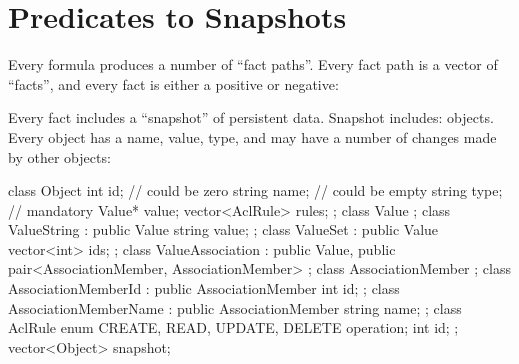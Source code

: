 \documentclass[12pt,oneside,letterpaper]{article}
\begin{document}
\section{Predicates to Snapshots}
\label{sec:to-data}

    Every formula produces a number of ``fact paths''. Every fact path
    is a vector of ``facts'', and every fact is either a positive or negative:


    Every fact includes a ``snapshot'' of persistent data. Snapshot includes:
    objects. Every object
    has a name, value, type,
    and may have a number of changes made by other objects:

    \begin{javacode}
    class Object {
        int id; // could be zero
        string name; // could be empty
        string type; // mandatory
        Value* value;
        vector<AclRule> rules;
    };
    class Value {};
        class ValueString : public Value {
            string value;
        };
        class ValueSet : public Value {
            vector<int> ids;
        };
        class ValueAssociation : public Value,
            public pair<AssociationMember, AssociationMember> {};
            class AssociationMember {};
                class AssociationMemberId : public AssociationMember {
                    int id;
                };
                class AssociationMemberName : public AssociationMember {
                    string name;
                };
    class AclRule {
        enum {CREATE, READ, UPDATE, DELETE} operation;
        int id;
    };
    vector<Object> snapshot;
    \end{javacode}
\end{document}
